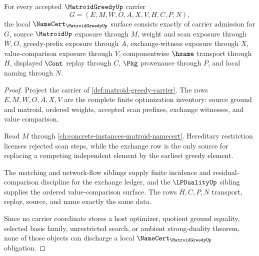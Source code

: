 \begin{theorem}
\label{thm:matroid-greedy-namecert-obligations}
For every accepted $\MatroidGreedyUp$ carrier
$$
G=(E,M,W,O,A,X,V,H,C,P,N),
$$
the local $\NameCert_{\MatroidGreedyUp}$ surface consists exactly of carrier admission for $G$, source $\MatroidUp$ exposure through $M$, weight and scan exposure through $W,O$, greedy-prefix exposure through $A$, exchange-witness exposure through $X$, value-comparison exposure through $V$, componentwise $\hsame$ transport through $H$, displayed $\Cont$ replay through $C$, $\Pkg$ provenance through $P$, and local naming through $N$.
\end{theorem}
\begin{proof}
Project the carrier of \autoref{def:matroid-greedy-carrier}. The rows $E,M,W,O,A,X,V$ are the complete finite optimization inventory: source ground and matroid, ordered weights, accepted scan prefixes, exchange witnesses, and value comparison.

Read $M$ through \autoref{ch:concrete-instances-matroid-namecert}. Hereditary restriction licenses rejected scan steps, while the exchange row is the only source for replacing a competing independent element by the earliest greedy element.

The matching and network-flow siblings supply finite incidence and residual-comparison discipline for the exchange ledger, and the $\LPDualityUp$ sibling supplies the ordered value-comparison surface. The rows $H,C,P,N$ transport, replay, source, and name exactly the same data.

Since no carrier coordinate stores a host optimizer, quotient ground equality, selected basis family, unrestricted search, or ambient strong-duality theorem, none of those objects can discharge a local $\NameCert_{\MatroidGreedyUp}$ obligation.
\end{proof}

